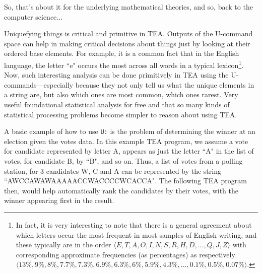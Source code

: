 \documentclass[a4paper, 18pt]{book} %
\begin{document}
{{{So, that's about it for the underlying mathematical theories, and so, back to the computer science...

\vspace{2em}

Uniquefying things is critical and primitive in TEA. Outputs of the U-command space can help in making critical decisions about things just by looking at their ordered base elements. For example, it is a common fact that in the English language, the letter ``e" occurs the most across all words in a typical lexicon\footnote{In fact, it is very interesting to note that there is a general agreement about which letters occur the most frequent in most samples of English writing, and these typically are in the order $\langle E, T, A, O, I, N, S, R, H, D, ..., Q, J, Z\rangle$ with corresponding approximate frequencies (as percentages) as  respectively $\langle 13\%, 9\%, 8\%, 7.7\%, 7.3\%, 6.9\%, 6.3\%, 6\%, 5.9\%, 4.3\%, ..., 0.1\%, 0.5\%, 0.07\% \rangle$\cite{copilot_assistant}.}. Now, such interesting analysis can be done primitively in TEA using the U-commands---especially because they not only tell us what the unique elements in a string are, but also which ones are most common, which ones rarest. Very useful foundational statistical analysis for free and that so many kinds of statistical processing problems become simpler to reason about using TEA.


\vspace{2em}

\vspace{2em}


A basic example of how to use \texttt{U:} is the problem of determining the winner at an election given the votes data. In this example TEA program, we assume a vote for candidate represented by letter A, appears as just the letter ``A" in the list of votes, for candidate B, by ``B", and so on. Thus, a list of votes from a polling station, for 3 candidates W, C and A can be represented by the string ``AWCCAWAWAAAAACCWACCCCWCACCA". The following TEA program then, would help automatically rank the candidates by their votes, with the winner appearing first in the result. 



}}}
\end{document}
